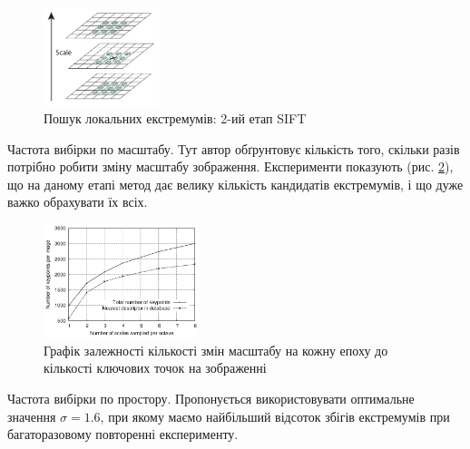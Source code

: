 \begin{enumerate}
          \begin{figure}[H]
              \centering
              \includegraphics[width=0.3\textwidth]{images/sift2}
              \caption{Пошук локальних екстремумів: 2-ий етап SIFT \cite{sift}
                  \label{fig:swift2}
              }
          \end{figure}

          \subitem Частота вибірки по масштабу. Тут автор обґрунтовує кількість того,
          скільки разів потрібно робити зміну масштабу зображення.
          Експерименти показують (рис. \ref{fig:swift3}),
          що на даному етапі метод дає велику кількість кандидатів екстремумів,
          і що дуже важко обрахувати їх всіх.

          \begin{figure}[H]
              \centering
              \includegraphics[width=0.4\textwidth]{images/sift3}
              \caption{Графік залежності кількості змін масштабу на кожну епоху до
                  кількості ключових точок на зображенні \cite{sift}
                  \label{fig:swift3}
              }
          \end{figure}
          \subitem Частота вибірки по простору. Пропонується використовувати оптимальне значення
          $\sigma = 1.6$, при якому
          маємо найбільший відсоток збігів екстремумів при багаторазовому повторенні
          експерименту.


\end{enumerate}
